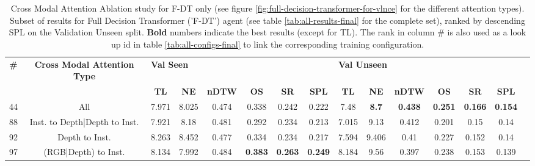 \begin{table}
\centering
\caption{\label{tab:full_dt_ablation}Cross Modal Attention Ablation study for F-DT only (see figure \ref{fig:full-decision-transformer-for-vlnce} for the different attention types). Subset of results for Full Decision Transformer ('F-DT') agent (see table \ref{tab:all-results-final} for the complete set), ranked by descending SPL on the Validation Unseen split. \textbf{Bold} numbers indicate the best results (except for TL). The rank in column \# is also used as a look up id in table \ref{tab:all-configs-final} to link the corresponding training configuration.}
\begin{tabular}{@{\hskip3pt}c@{\hskip3pt}c@{\hskip3pt}c@{\hskip3pt}c@{\hskip3pt}c@{\hskip3pt}c@{\hskip3pt}c@{\hskip3pt}c@{\hskip3pt}c@{\hskip3pt}c@{\hskip3pt}c@{\hskip3pt}c@{\hskip3pt}c@{\hskip3pt}c@{\hskip3pt}c}
\toprule
                                  \textbf{\#} & \textbf{Cross Modal Attention Type} & \multicolumn{6}{l}{\textbf{Val Seen}} & \multicolumn{6}{l}{\textbf{Val Unseen}} \\
\cmidrule(l){3-8}\cmidrule(l){9-14}\textbf{~} &                          \textbf{~} &       \textbf{TL} &    \textbf{NE} &   \textbf{nDTW} &     \textbf{OS} &     \textbf{SR} &    \textbf{SPL} &         \textbf{TL} &   \textbf{NE} &   \textbf{nDTW} &     \textbf{OS} &     \textbf{SR} &    \textbf{SPL} \\
\midrule
                                           44 &                                 All &             7.971 &          8.025 &           0.474 &           0.338 &           0.242 &           0.222 &                7.48 &  \textbf{8.7} &  \textbf{0.438} &  \textbf{0.251} &  \textbf{0.166} &  \textbf{0.154} \\
                                           88 &       Inst. to Depth|Depth to Inst. &             7.921 &           8.18 &           0.481 &           0.292 &           0.234 &           0.213 &               7.015 &          9.13 &           0.412 &           0.201 &            0.15 &            0.14 \\
                                           92 &                      Depth to Inst. &             8.263 &          8.452 &           0.477 &           0.334 &           0.234 &           0.217 &               7.594 &         9.406 &            0.41 &           0.227 &           0.152 &            0.14 \\
                                           97 &                (RGB|Depth) to Inst. &             8.134 &          7.992 &           0.484 &  \textbf{0.383} &  \textbf{0.263} &  \textbf{0.249} &               8.184 &          9.56 &           0.397 &           0.238 &           0.153 &           0.139 \\

\end{tabular}
\end{table}

